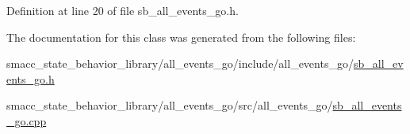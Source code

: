Definition at line 20 of file sb\+\_\+all\+\_\+events\+\_\+go.\+h.



The documentation for this class was generated from the following files\+:\begin{DoxyCompactItemize}
\item 
smacc\+\_\+state\+\_\+behavior\+\_\+library/all\+\_\+events\+\_\+go/include/all\+\_\+events\+\_\+go/\hyperlink{sb__all__events__go_8h}{sb\+\_\+all\+\_\+events\+\_\+go.\+h}\item 
smacc\+\_\+state\+\_\+behavior\+\_\+library/all\+\_\+events\+\_\+go/src/all\+\_\+events\+\_\+go/\hyperlink{sb__all__events__go_8cpp}{sb\+\_\+all\+\_\+events\+\_\+go.\+cpp}\end{DoxyCompactItemize}
